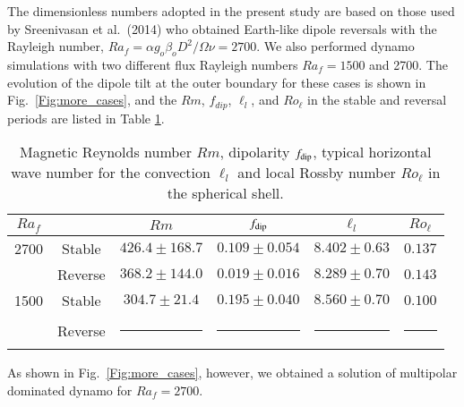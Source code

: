 The dimensionless numbers adopted in the present study are based on those used by Sreenivasan et al.\ (2014) who obtained Earth-like dipole reversals with the Rayleigh number, $Ra_f = \alpha g_o \beta_o D^2 / \Omega \nu = 2700$.
We also performed dynamo simulations with two different flux Rayleigh numbers $Ra_{f} = 1500$ and 2700. The evolution of the dipole tilt at the outer boundary for these cases is shown in Fig.~\ref{Fig:more_cases}, and the $Rm$, $f_{dip}$, $\ell_{l}$, and $Ro_{\ell}$ in the stable and reversal periods are listed in Table \ref{table:average_dipolarity_2}.

\begin{table}[t]
\caption{Magnetic Reynolds number $Rm$, dipolarity $f_{\rm dip}$, 
typical horizontal wave number for the convection $\ell_{l}$
and local Rossby number $Ro_{\ell}$ in the spherical shell.}
\label{table:average_dipolarity_2}
\renewcommand{\arraystretch}{1.3} %
\begin{tabular}{cc|cccc}
$Ra_f$ & & $Rm$ & $f_{\rm dip}$ & 
  ${\ell}_{l}$ & $Ro_{\ell}$ \\ \hline
2700 & \mbox{Stable} & $426.4 \pm 168.7 $ &
                $0.109 \pm 0.054$ &
                $8.402 \pm 0.63$ & 
                $0.137$ \\
& \mbox{Reverse} & $368.2 \pm 144.0 $ &
                 $0.019 \pm 0.016$ &
                 $8.289 \pm 0.70$ & 
                 $0.143$\\ \hline
1500 & \mbox{Stable} & $304.7 \pm 21.4 $ &
                $0.195 \pm 0.040$ &
                $8.560 \pm 0.70$ & 
                $0.100$ \\
& \mbox{Reverse} &  \rule[0.5ex]{2em}{0.4pt} &
                  \rule[0.5ex]{2em}{0.4pt} &
                  \rule[0.5ex]{2em}{0.4pt} & 
                  \rule[0.5ex]{2em}{0.4pt} \\ \hline\end{tabular}
\end{table}
%
As shown in Fig.~\ref{Fig:more_cases}, however, we obtained a solution of multipolar dominated dynamo for $Ra_f = 2700$.
